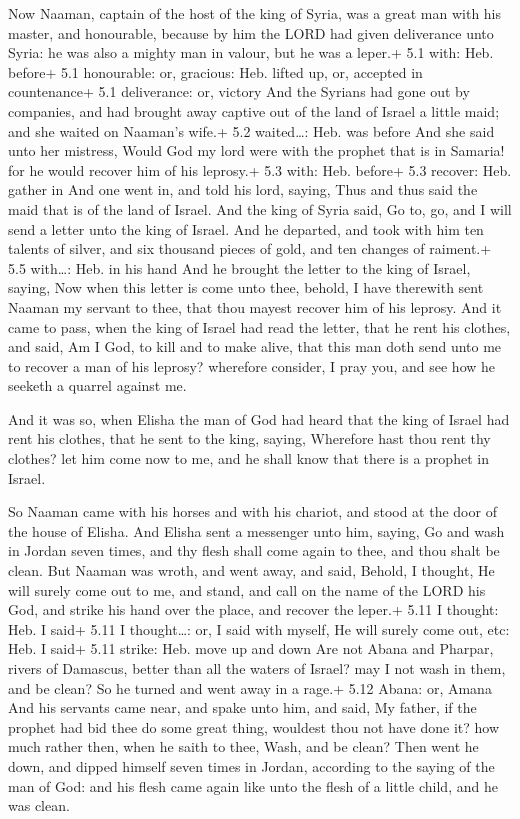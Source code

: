  Now Naaman, captain of the host of the king of Syria, was a
great man with his master, and honourable, because by him the LORD had
given deliverance unto Syria: he was also a mighty man in valour, but he
was a leper.+ 5.1 with: Heb. before+ 5.1 honourable: or, gracious: Heb.
lifted up, or, accepted in countenance+ 5.1 deliverance: or, victory
 And the Syrians had gone out by companies, and had brought
away captive out of the land of Israel a little maid; and she waited on
Naaman's wife.+ 5.2 waited\ldots: Heb. was before  And she
said unto her mistress, Would God my lord were with the prophet that is
in Samaria! for he would recover him of his leprosy.+ 5.3 with: Heb.
before+ 5.3 recover: Heb. gather in  And one went in, and
told his lord, saying, Thus and thus said the maid that is of the land
of Israel.  And the king of Syria said, Go to, go, and I
will send a letter unto the king of Israel. And he departed, and took
with him ten talents of silver, and six thousand pieces of gold, and ten
changes of raiment.+ 5.5 with\ldots: Heb. in his hand  And
he brought the letter to the king of Israel, saying, Now when this
letter is come unto thee, behold, I have therewith sent Naaman my
servant to thee, that thou mayest recover him of his leprosy.
 And it came to pass, when the king of Israel had read the
letter, that he rent his clothes, and said, Am I God, to kill and to
make alive, that this man doth send unto me to recover a man of his
leprosy? wherefore consider, I pray you, and see how he seeketh a
quarrel against me.

 And it was so, when Elisha the man of God had heard that
the king of Israel had rent his clothes, that he sent to the king,
saying, Wherefore hast thou rent thy clothes? let him come now to me,
and he shall know that there is a prophet in Israel.

 So Naaman came with his horses and with his chariot, and
stood at the door of the house of Elisha.  And Elisha sent
a messenger unto him, saying, Go and wash in Jordan seven times, and thy
flesh shall come again to thee, and thou shalt be clean. 
But Naaman was wroth, and went away, and said, Behold, I thought, He
will surely come out to me, and stand, and call on the name of the LORD
his God, and strike his hand over the place, and recover the leper.+
5.11 I thought: Heb. I said+ 5.11 I thought\ldots: or, I said with
myself, He will surely come out, etc: Heb. I said+ 5.11 strike: Heb.
move up and down  Are not Abana and Pharpar, rivers of
Damascus, better than all the waters of Israel? may I not wash in them,
and be clean? So he turned and went away in a rage.+ 5.12 Abana: or,
Amana  And his servants came near, and spake unto him, and
said, My father, if the prophet had bid thee do some great thing,
wouldest thou not have done it? how much rather then, when he saith to
thee, Wash, and be clean?  Then went he down, and dipped
himself seven times in Jordan, according to the saying of the man of
God: and his flesh came again like unto the flesh of a little child, and
he was clean.

